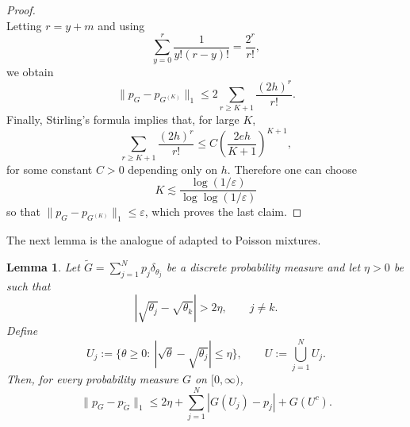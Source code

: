 \documentclass[twoside,12pt]{article}
\newtheorem{lem}[thm]{Lemma}
\begin{document}
\begin{proof}
\begin{displaymath}
\end{displaymath}
Letting $r=y+m$ and using
\begin{displaymath}
\sum_{y=0}^r\frac{1}{y!(r-y)!}=\frac{2^r}{r!},
\end{displaymath}
we obtain
\begin{displaymath}
\|p_G-p_{G^{(K)}}\|_1\le2\sum_{r\geq K+1}\frac{(2h)^r}{r!}.
\end{displaymath}
Finally, Stirling's formula implies that, for large $K$,
\begin{displaymath}
\sum_{r\geq K+1}\frac{(2h)^r}{r!}\le C\left(\frac{2eh}{K+1}\right)^{K+1},
\end{displaymath}
for some constant $C>0$ depending only on $h$. Therefore one can choose
\begin{displaymath}
K\lesssim\frac{\log(1/\varepsilon)}{\log\log(1/\varepsilon)}
\end{displaymath}
so that $\|p_G-p_{G^{(K)}}\|_1\le\varepsilon$, which proves the last claim.
\end{proof}

The next lemma is the analogue of \citet[Lemma 5.1]{Gho(01)} adapted to Poisson mixtures.

\begin{lem}\label{lem:Poisson_L1_local}
Let $\tilde G=\sum_{j=1}^N p_j\delta_{\theta_j}$ be a discrete probability measure and let $\eta>0$ be such that
\begin{displaymath}
|\sqrt{\theta_j}-\sqrt{\theta_k}|>2\eta,
\qquad j\neq k.
\end{displaymath}
Define
\begin{displaymath}
U_j:=\{\theta\ge 0:\ |\sqrt{\theta}-\sqrt{\theta_j}|\le \eta\},\qquad U:=\bigcup_{j=1}^N U_j.
\end{displaymath}
Then, for every probability measure $G$ on $[0,\infty)$,
\begin{displaymath}
\|p_G-p_{\tilde G}\|_1\le 2\eta+\sum_{j=1}^N |G(U_j)-p_j|+G(U^c).
\end{displaymath}
\end{lem}
\end{document}
